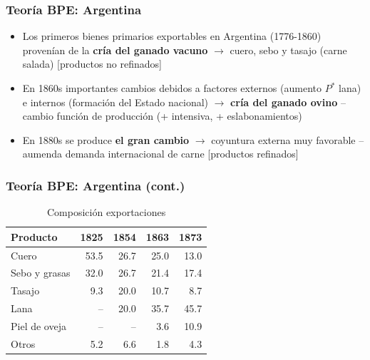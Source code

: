 \documentclass[14pt,aspectratio=169]{beamer}
\begin{document}
\begin{frame}\frametitle{Teoría BPE: Argentina}
  \begin{itemize}
  \item Los primeros bienes primarios exportables en Argentina (1776-1860)
    provenían de la \textbf{cría del ganado vacuno} $\longrightarrow$
    cuero, sebo y tasajo (carne salada) [productos no refinados]
    \item En 1860s importantes cambios debidos a factores externos
      (aumento $P^{*}$ lana) e internos (formación del
      Estado nacional) $\longrightarrow$ \textbf{cría del ganado
        ovino} --cambio función de producción (+ intensiva, + eslabonamientos)
      \item En 1880s se produce \textbf{el gran cambio} $\longrightarrow$
        coyuntura externa muy favorable --aumenda demanda
        internacional de carne [productos refinados]
          \end{itemize}
        \end{frame}
  


\begin{frame}\frametitle{Teoría BPE: Argentina (cont.)}
  \begin{table}[htbp]
    \centering
    \begin{tabular}[htbp]{lrrrr}\hline\hline 
      Producto & 1825 & 1854 & 1863 & 1873  \\\hline
      Cuero & 53.5 & 26.7 &  25.0  &  13.0  \\
      Sebo y grasas  & 32.0   & 26.7 &  21.4  & 17.4 \\
      Tasajo& 9.3  & 20.0   & 10.7 &  8.7 \\
      Lana  &  --    & 20.0  & 35.7 & 45.7  \\
      Piel de oveja & -- & -- & 3.6 & 10.9 \\
      Otros & 5.2  & 6.6 & 1.8  & 4.3  \\                              
                                \end{tabular}
    \caption{Composición exportaciones}
    \label{tab:table1}
  \end{table}
        \end{frame}
  
\end{document}
